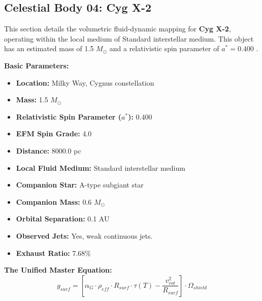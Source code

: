 \documentclass[11pt, a4paper]{article}
\begin{document}
\clearpage
\subsection{Celestial Body 04: Cyg X-2}
This section details the volumetric fluid-dynamic mapping for \textbf{Cyg X-2}, operating within the local medium of Standard interstellar medium. This object has an estimated mass of 1.5 $M_{\odot}$ and a relativistic spin parameter of $a^* = 0.400$ \cite{casares2010, simbad}.

\vspace{0.5em}
\noindent \textbf{Basic Parameters:}
\begin{itemize}
  \item \textbf{Location:} Milky Way, Cygnus constellation
  \item \textbf{Mass:} 1.5 $M_{\odot}$
  \item \textbf{Relativistic Spin Parameter ($a^*$):} 0.400
  \item \textbf{EFM Spin Grade:} 4.0
  \item \textbf{Distance:} 8000.0 pc
  \item \textbf{Local Fluid Medium:} Standard interstellar medium
  \item \textbf{Companion Star:} A-type subgiant star
  \item \textbf{Companion Mass:} 0.6 $M_{\odot}$
  \item \textbf{Orbital Separation:} 0.1 AU
  \item \textbf{Observed Jets:} Yes, weak continuous jets.
  \item \textbf{Exhaust Ratio:} 7.68\%
\end{itemize}

\vspace{0.5em}
\noindent \textbf{The Unified Master Equation:}
$$ g_{surf} = \left[ \alpha_G \cdot \rho_{eff} \cdot R_{surf} \cdot \tau(T) - \frac{v_{rot}^2}{R_{surf}} \right] \cdot \Omega_{shield} $$
\end{document}
